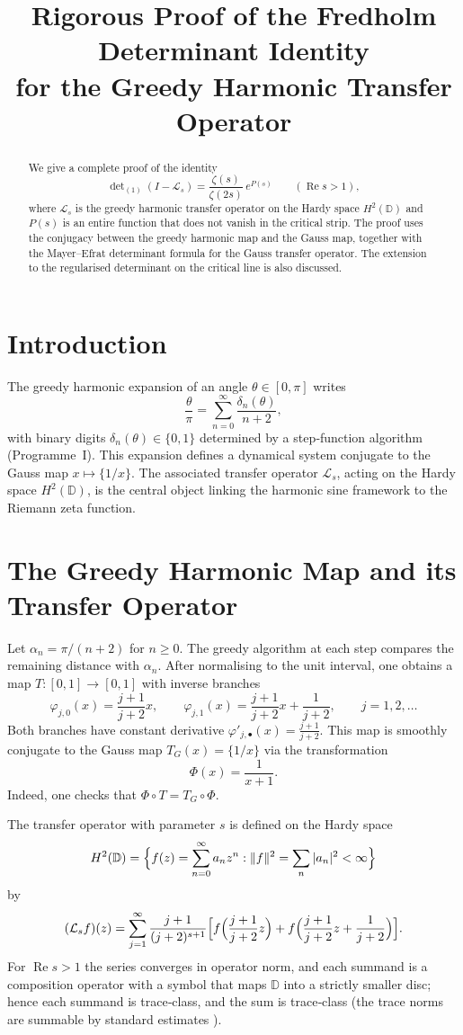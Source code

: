 \documentclass[11pt,a4paper]{article}
\title{\bfseries Rigorous Proof of the Fredholm Determinant Identity\\
for the Greedy Harmonic Transfer Operator}
\author{}
\date{}
\theoremstyle{remark}
\begin{document}
\maketitle

\begin{abstract}
We give a complete proof of the identity
\[
\det\nolimits_{(1)}(I-\mathcal{L}_s)=\frac{\zeta(s)}{\zeta(2s)}\,e^{P(s)}\qquad(\operatorname{Re}s>1),
\]
where \(\mathcal{L}_s\) is the greedy harmonic transfer operator on the Hardy space \(H^2(\mathbb{D})\) and \(P(s)\) is an entire function that does not vanish in the critical strip.  The proof uses the conjugacy between the greedy harmonic map and the Gauss map, together with the Mayer–Efrat determinant formula for the Gauss transfer operator.  The extension to the regularised determinant on the critical line is also discussed.
\end{abstract}

\section{Introduction}
The greedy harmonic expansion of an angle \(\theta\in[0,\pi]\) writes
\[
\frac{\theta}{\pi}=\sum_{n=0}^{\infty}\frac{\delta_n(\theta)}{n+2},
\]
with binary digits \(\delta_n(\theta)\in\{0,1\}\) determined by a step‑function algorithm (Programme~I).  This expansion defines a dynamical system conjugate to the Gauss map \(x\mapsto\{1/x\}\).  The associated transfer operator \(\mathcal{L}_s\), acting on the Hardy space \(H^2(\mathbb{D})\), is the central object linking the harmonic sine framework to the Riemann zeta function.

\section{The Greedy Harmonic Map and its Transfer Operator}
Let \(\alpha_n=\pi/(n+2)\) for \(n\ge0\).  The greedy algorithm at each step compares the remaining distance with \(\alpha_n\).  After normalising to the unit interval, one obtains a map \(T:[0,1]\to[0,1]\) with inverse branches
\[
\varphi_{j,0}(x)=\frac{j+1}{j+2}x,\qquad
\varphi_{j,1}(x)=\frac{j+1}{j+2}x+\frac{1}{j+2},\qquad j=1,2,\dots
\]
Both branches have constant derivative \(\varphi'_{\!j,\bullet}(x)=\frac{j+1}{j+2}\).  This map is smoothly conjugate to the Gauss map \(T_G(x)=\{1/x\}\) via the transformation
\[
\Phi(x)=\frac{1}{x+1}.
\]
Indeed, one checks that \(\Phi\circ T = T_G\circ\Phi\).

The transfer operator with parameter \(s\) is defined on the Hardy space
\[
H^2(\mathbb{D})=\Bigl\{f(z)=\sum_{n=0}^{\infty}a_nz^n:\|f\|^2=\sum_{n}|a_n|^2<\infty\Bigr\}
\]
by
\begin{equation}\label{defL}
(\mathcal{L}_s f)(z)=\sum_{j=1}^{\infty}\frac{j+1}{(j+2)^{s+1}}
\Bigl[ f\Bigl(\frac{j+1}{j+2}z\Bigr)+ f\Bigl(\frac{j+1}{j+2}z+\frac{1}{j+2}\Bigr) \Bigr].
\end{equation}
For \(\operatorname{Re}s>1\) the series converges in operator norm, and each summand is a composition operator with a symbol that maps \(\mathbb{D}\) into a strictly smaller disc; hence each summand is trace‑class, and the sum is trace‑class (the trace norms are summable by standard estimates \cite{ShapiroShields}).
\end{document}
